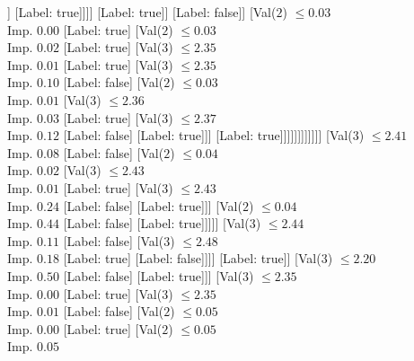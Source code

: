 \documentclass[margin=10pt]{standalone}
\begin{document}
\begin{forest}
																							]
																						[Label: true]]]]
																			[Label: true]]
																		[Label: false]]
																	[Val($2$) $ \leq 0.03$ \\ Imp. $0.00$
																		[Label: true]
																		[Val($2$) $ \leq 0.03$ \\ Imp. $0.02$
																			[Label: true]
																			[Val($3$) $ \leq 2.35$ \\ Imp. $0.01$
																				[Label: true]
																				[Val($3$) $ \leq 2.35$ \\ Imp. $0.10$
																					[Label: false]
																					[Val($2$) $ \leq 0.03$ \\ Imp. $0.01$
																						[Val($3$) $ \leq 2.36$ \\ Imp. $0.03$
																							[Label: true]
																							[Val($3$) $ \leq 2.37$ \\ Imp. $0.12$
																								[Label: false]
																								[Label: true]]]
																						[Label: true]]]]]]]]]]]]
											[Val($3$) $ \leq 2.41$ \\ Imp. $0.08$
												[Label: false]
												[Val($2$) $ \leq 0.04$ \\ Imp. $0.02$
													[Val($3$) $ \leq 2.43$ \\ Imp. $0.01$
														[Label: true]
														[Val($3$) $ \leq 2.43$ \\ Imp. $0.24$
															[Label: false]
															[Label: true]]]
													[Val($2$) $ \leq 0.04$ \\ Imp. $0.44$
														[Label: false]
														[Label: true]]]]]
										[Val($3$) $ \leq 2.44$ \\ Imp. $0.11$
											[Label: false]
											[Val($3$) $ \leq 2.48$ \\ Imp. $0.18$
												[Label: true]
												[Label: false]]]]
									[Label: true]]
								[Val($3$) $ \leq 2.20$ \\ Imp. $0.50$
									[Label: false]
									[Label: true]]]
							[Val($3$) $ \leq 2.35$ \\ Imp. $0.00$
								[Label: true]
								[Val($3$) $ \leq 2.35$ \\ Imp. $0.01$
									[Label: false]
									[Val($2$) $ \leq 0.05$ \\ Imp. $0.00$
										[Label: true]
										[Val($2$) $ \leq 0.05$ \\ Imp. $0.05$

\end{forest}
\end{document}
